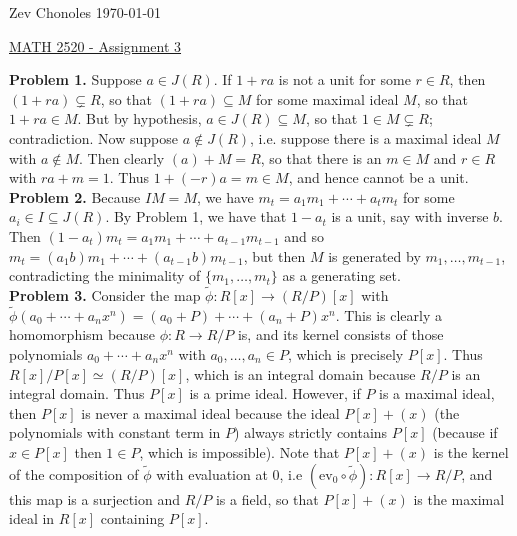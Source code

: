 \documentclass[11pt]{article}
\newcommand{\num}[1]{\noindent \textbf{#1}}
\theoremstyle{definition}
\begin{document}
\noindent Zev Chonoles \hfill \today\\[-0.4in]
\begin{center}
\noindent \underline{MATH 2520 - Assignment 3}
\end{center}

\num{Problem 1.} Suppose $a\in J(R)$. If $1+ra$ is not a unit for some $r\in
R$, then $(1+ra)\subsetneq R$, so that $(1+ra)\subseteq M$ for some maximal
ideal $M$, so that $1+ra\in M$. But by hypothesis, $a\in J(R)\subseteq M$,
so that $1\in M\subsetneq R$; contradiction. Now suppose $a\notin J(R)$,
i.e. suppose there is a maximal ideal $M$ with $a\notin M$. Then clearly
$(a)+M=R$, so that there is an $m\in M$ and $r\in R$ with $ra+m=1$. Thus
$1+(-r)a=m\in M$, and hence cannot be a unit.       \\

\num{Problem 2.} Because $IM=M$, we have $m_t=a_1m_1+\cdots+a_tm_t$ for some
$a_i\in I\subseteq J(R)$. By Problem 1, we have that $1-a_t$ is a unit,
say with inverse $b$. Then $(1-a_t)m_t=a_1m_1+\cdots+a_{t-1}m_{t-1}$ and
so $m_t=(a_1b)m_1+\cdots+(a_{t-1}b)m_{t-1}$, but then $M$ is generated by
$m_1,\ldots,m_{t-1}$, contradicting the minimality of $\{m_1,\ldots,m_t\}$
as a generating set.       \\

\num{Problem 3.} Consider the map $\tilde{\phi}:R[x]\rightarrow(R/P)[x]$ with
$\tilde{\phi}(a_0+\cdots+a_nx^n)=(a_0+P)+\cdots+(a_n+P)x^n$. This is clearly
a homomorphism because $\phi:R\rightarrow R/P$ is, and its kernel consists
of those polynomials $a_0+\cdots+a_nx^n$ with $a_0,\ldots,a_n\in P$, which is
precisely $P[x]$. Thus $R[x]/P[x]\simeq (R/P)[x]$, which is an integral domain
because $R/P$ is an integral domain. Thus $P[x]$ is a prime ideal. However, if
$P$ is a maximal ideal, then $P[x]$ is never a maximal ideal because the ideal
$P[x]+(x)$ (the polynomials with constant term in $P$) always strictly contains
$P[x]$ (because if $x\in P[x]$ then $1\in P$, which is impossible). Note
that $P[x]+(x)$ is the kernel of the composition of $\tilde{\phi}$ with
evaluation at 0, i.e $(\text{ev}_0\circ\tilde{\phi}):R[x]\rightarrow R/P$,
and this map is a surjection and $R/P$ is a field, so that $P[x]+(x)$ is
the maximal ideal in $R[x]$ containing $P[x]$.       \\
\end{document}
